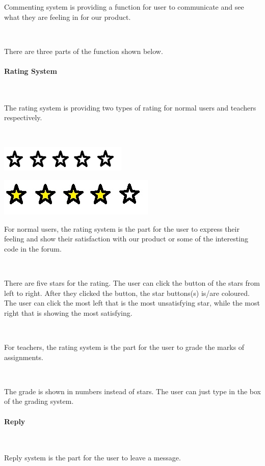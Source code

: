Commenting system is providing a function for user to communicate and see what they are feeling in for our product.\par~

There are three parts of the function shown below.

\paragraph{Rating System}~

The rating system is providing two types of rating for normal users and teachers respectively.\par~

\includegraphics[scale=0.7]{Doc/Graphics/0star}

\includegraphics[scale=0.56]{Doc/Graphics/4star}

For normal users, the rating system is the part for the user to express their feeling and show their satisfaction with our product or some of the interesting code in the forum.\par~

There are five stars for the rating. The user can click the button of the stars from left to right. After they clicked the button, the star buttons(s) is/are coloured. The user can click the most left that is the most unsatisfying star, while the most right that is showing the most satisfying.\par~

For teachers, the rating system is the part for the user to grade the marks of assignments.\par~

The grade is shown in numbers instead of stars. The user can just type in the box of the grading system.

\paragraph{Reply}~

Reply system is the part for the user to leave a message.\par~

